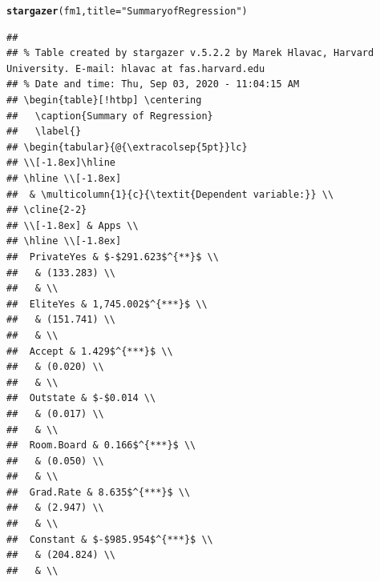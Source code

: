 \documentclass{article}\usepackage[]{graphicx}\usepackage[]{color}
\makeatletter
\newcommand{\hlstr}[1]{\textcolor[rgb]{0.192,0.494,0.8}{#1}}%
\newcommand{\hlstd}[1]{\textcolor[rgb]{0.345,0.345,0.345}{#1}}%
\newcommand{\hlkwc}[1]{\textcolor[rgb]{0.333,0.667,0.333}{#1}}%
\newcommand{\hlkwd}[1]{\textcolor[rgb]{0.737,0.353,0.396}{\textbf{#1}}}%
\newenvironment{kframe}{%
 \def\at@end@of@kframe{}%
 \ifinner\ifhmode%
  \def\at@end@of@kframe{\end{minipage}}%
  \begin{minipage}{\columnwidth}%
 \fi\fi%
 \def\FrameCommand##1{\hskip\@totalleftmargin \hskip-\fboxsep
 \colorbox{shadecolor}{##1}\hskip-\fboxsep
     \hskip-\linewidth \hskip-\@totalleftmargin \hskip\columnwidth}%
 \MakeFramed {\advance\hsize-\width
   \@totalleftmargin\z@ \linewidth\hsize
   \@setminipage}}%
 {\par\unskip\endMakeFramed%
 \at@end@of@kframe}
\newenvironment{knitrout}{}{} %
\makeatother
\begin{document}
\begin{knitrout}
\color{fgcolor}\begin{kframe}
\begin{alltt}
\hlkwd{stargazer}\hlstd{(fm1,} \hlkwc{title} \hlstd{=} \hlstr{"Summary of Regression"}\hlstd{)}
\end{alltt}
\begin{verbatim}
## 
## % Table created by stargazer v.5.2.2 by Marek Hlavac, Harvard University. E-mail: hlavac at fas.harvard.edu
## % Date and time: Thu, Sep 03, 2020 - 11:04:15 AM
## \begin{table}[!htbp] \centering 
##   \caption{Summary of Regression} 
##   \label{} 
## \begin{tabular}{@{\extracolsep{5pt}}lc} 
## \\[-1.8ex]\hline 
## \hline \\[-1.8ex] 
##  & \multicolumn{1}{c}{\textit{Dependent variable:}} \\ 
## \cline{2-2} 
## \\[-1.8ex] & Apps \\ 
## \hline \\[-1.8ex] 
##  PrivateYes & $-$291.623$^{**}$ \\ 
##   & (133.283) \\ 
##   & \\ 
##  EliteYes & 1,745.002$^{***}$ \\ 
##   & (151.741) \\ 
##   & \\ 
##  Accept & 1.429$^{***}$ \\ 
##   & (0.020) \\ 
##   & \\ 
##  Outstate & $-$0.014 \\ 
##   & (0.017) \\ 
##   & \\ 
##  Room.Board & 0.166$^{***}$ \\ 
##   & (0.050) \\ 
##   & \\ 
##  Grad.Rate & 8.635$^{***}$ \\ 
##   & (2.947) \\ 
##   & \\ 
##  Constant & $-$985.954$^{***}$ \\ 
##   & (204.824) \\ 
##   & \\ 

\end{verbatim}
\end{kframe}
\end{knitrout}
\end{document}
